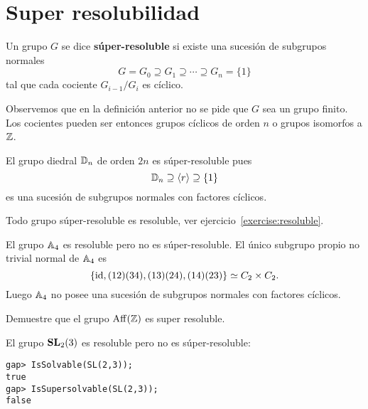 \chapter{Super resolubilidad}

\label{super}

\begin{definition}
	Un grupo $G$ se dice \textbf{súper-resoluble} si existe una sucesión de
	subgrupos normales
	\[
		G=G_0\supseteq G_1\supseteq\cdots\supseteq G_n=\{1\}
	\]
	tal que cada cociente $G_{i-1}/G_i$ es cíclico.
\end{definition}

Observemos que en la definición anterior no se pide que $G$ sea un grupo finito. Los cocientes
pueden ser entonces grupos cíclicos de orden $n$ o grupos isomorfos a $\mathbb{Z}$. 

\begin{example}
	El grupo diedral $\mathbb{D}_{n}$ de orden $2n$ es súper-resoluble pues 
    \[	
    \mathbb{D}_{n}\supseteq \langle
	r\rangle\supseteq \{1\}
	\]
	es una sucesión de subgrupos normales con factores
	cíclicos.
\end{example}

Todo grupo súper-resoluble es resoluble, ver ejercicio~\ref{exercise:resoluble}.

\begin{example}
	El grupo $\mathbb{A}_4$ es resoluble pero no es súper-resoluble. El único 
	subgrupo propio no trivial normal de $\mathbb{A}_4$ es
	\[
	\{\operatorname{id},(12)(34),(13)(24),(14)(23)\}\simeq C_2\times C_2.
	\]
	Luego $\mathbb{A}_4$ no posee una sucesión de subgrupos normales con factores
	cíclicos.	
\end{example}

\begin{exercise}
    Demuestre que el grupo $\mathrm{Aff}(\mathbb{Z})$ es super resoluble. 
\end{exercise}

\begin{example}
	El grupo $\mathbf{SL}_2(3)$ es resoluble pero no es súper-resoluble:
\begin{lstlisting}
gap> IsSolvable(SL(2,3));
true
gap> IsSupersolvable(SL(2,3));
false
\end{lstlisting}
\end{example}

